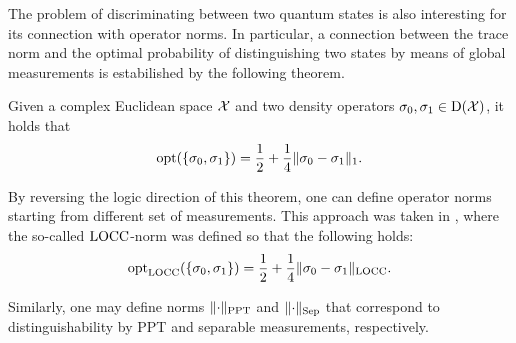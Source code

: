 The problem of discriminating between two quantum states is also 
interesting for its connection with operator norms. 
In particular, a connection between the trace norm and the 
optimal probability of distinguishing two states by means of global measurements 
is estabilished by the following theorem.
\begin{theorem}
Given a complex Euclidean space $\mathcal{X}$ and two density operators
$\sigma_{0}, \sigma_{1} \in \mathrm{D}(\mathcal{X})$, it holds that
  \begin{equation}
    \operatorname{opt}(\{\sigma_{0},\sigma_{1}\}) = 
      \frac{1}{2} + \frac{1}{4}\lVert\sigma_{0}-\sigma_{1}\rVert_{1}.
  \end{equation}
\end{theorem}
By reversing the logic direction of this theorem, one can define operator norms 
starting from different set of measurements.
This approach was taken in \cite{Matthews09}, where the so-called $\mathrm{LOCC}$-norm 
was defined so that the following holds:
\begin{equation}
  \operatorname{opt}_{\mathrm{LOCC}}(\{\sigma_{0},\sigma_{1}\}) = 
    \frac{1}{2} + \frac{1}{4}\lVert\sigma_{0}-\sigma_{1}\rVert_{\mathrm{LOCC}}.
\end{equation}

Similarly, one may define norms $\lVert\cdot\rVert_{\mathrm{PPT}}$ and $\lVert\cdot\rVert_{\mathrm{Sep}}$
that correspond to distinguishability by PPT and separable measurements,
respectively. 

